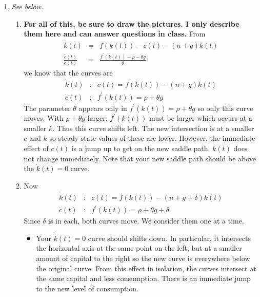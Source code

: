 \documentclass[12pt]{article}
\begin{document}
\begin{enumerate}
\item \textit{See below.}
\begin{enumerate}
\item \textbf{For all of this, be sure to draw the pictures. I only
describe them here and can answer questions in class.} From 
\begin{eqnarray*}
\dot{k}\left( t\right)  &=&f\left( k\left( t\right) \right) -c\left(
t\right) -\left( n+g\right) k\left( t\right)  \\
\frac{\dot{c}\left( t\right) }{c\left( t\right) } &=&\frac{f^{\prime }\left(
k\left( t\right) \right) -\rho -\theta g}{\theta }
\end{eqnarray*}%
we know that the curves are  
\begin{eqnarray*}
\dot{k}\left( t\right)  &:&c\left( t\right) =f\left( k\left( t\right)
\right) -\left( n+g\right) k\left( t\right)  \\
\dot{c}\left( t\right)  &:&f^{\prime }\left( k\left( t\right) \right) =\rho
+\theta g
\end{eqnarray*}%
The parameter $\theta $ appears only in $f^{\prime }\left( k\left( t\right)
\right) =\rho +\theta g$ so only this curve moves. With $\rho +\theta g$
larger, $f^{\prime }\left( k\left( t\right) \right) $ must be larger which
occurs at a smaller $k$. Thus this curve shifts left. The new intersection
is at a smaller $c$ and $k$ so steady state values of these are lower.
However, the immediate effect of $c\left( t\right) $ is a jump up to get on
the new saddle path. $k(t)$ does not change immediately. Note that your new
saddle path should be above the $\dot{k}\left( t\right) =0$ curve. 

\item Now 
\begin{eqnarray*}
\dot{k}\left( t\right)  &:&c\left( t\right) =f\left( k\left( t\right)
\right) -\left( n+g+\delta \right) k\left( t\right)  \\
\dot{c}\left( t\right)  &:&f^{\prime }\left( k\left( t\right) \right) =\rho
+\theta g+\delta 
\end{eqnarray*}
Since $\delta $ is in each, both curves move. We consider them one at a
time. 

\begin{itemize}
\item Your $\dot{k}\left( t\right) =0$ curve should shifts down. In
particular, it intersects the horizontal axis at the same point on the left,
but at a smaller amount of capital to the right so the new curve is
everywhere below the original curve. From this effect in isolation, the
curves intersect at the same capital and less consumption. There is an
immediate jump to the new level of consumption. 


\end{itemize}
\end{enumerate}
\end{enumerate}
\end{document}
